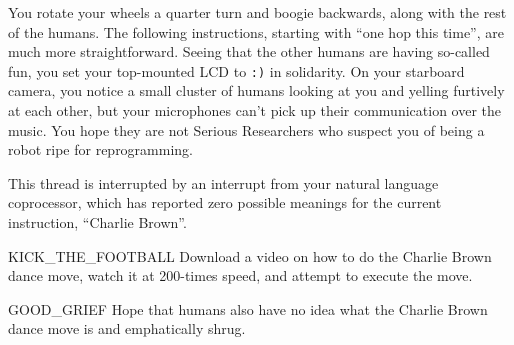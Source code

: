 You rotate your wheels a quarter turn and boogie backwards,
along with the rest of the humans.
The following instructions,
starting with ``one hop this time'', are much more straightforward.
Seeing that the other humans are having so-called fun,
you set your top-mounted LCD to \texttt{:)} in solidarity.
On your starboard camera, you notice a small cluster of humans
looking at you and yelling furtively at each other,
but your microphones can't pick up their communication over the music.
You hope they are not Serious Researchers who suspect you of being
a robot ripe for reprogramming.

This thread is interrupted by an interrupt
from your natural language coprocessor,
which has reported zero possible meanings for the current instruction,
``Charlie Brown''.

\begin{switch}
\item{KICK\_THE\_FOOTBALL}
  Download a video on how to do the Charlie Brown dance move,
  watch it at 200-times speed,
  and attempt to execute the move.
\item{GOOD\_GRIEF}
  Hope that humans also have no idea what the Charlie Brown dance move is
  and emphatically shrug.
\end{switch}


